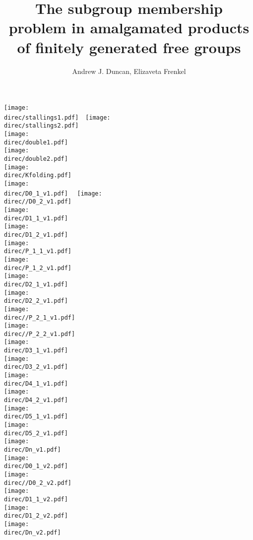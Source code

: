 \documentclass[a4paper,12pt]{article}
\title{The subgroup membership problem in amalgamated products of 
finitely generated free groups
}
\author{Andrew J. Duncan, Elizaveta Frenkel}
\newcommand{\direc}{input_K}
\numberwithin{equation}{section}
\numberwithin{figure}{section}
\begin{document}
\texttt{[image: \\direc/stallings1.pdf]}~~\texttt{[image: \\direc/stallings2.pdf]}\\
\texttt{[image: \\direc/double1.pdf]}\\
\texttt{[image: \\direc/double2.pdf]}\\
\texttt{[image: \\direc/Kfolding.pdf]}\\
\texttt{[image: \\direc/D0\_1\_v1.pdf]}~~
\texttt{[image: \\direc//D0\_2\_v1.pdf]}\\
\texttt{[image: \\direc/D1\_1\_v1.pdf]}\\
\texttt{[image: \\direc/D1\_2\_v1.pdf]}\\
\texttt{[image: \\direc/P\_1\_1\_v1.pdf]}\\
\texttt{[image: \\direc/P\_1\_2\_v1.pdf]}\\
\texttt{[image: \\direc/D2\_1\_v1.pdf]}\\
\texttt{[image: \\direc/D2\_2\_v1.pdf]}\\
\texttt{[image: \\direc//P\_2\_1\_v1.pdf]}\\
\texttt{[image: \\direc//P\_2\_2\_v1.pdf]}\\
\texttt{[image: \\direc/D3\_1\_v1.pdf]}\\
\texttt{[image: \\direc/D3\_2\_v1.pdf]}\\
\texttt{[image: \\direc/D4\_1\_v1.pdf]}\\
\texttt{[image: \\direc/D4\_2\_v1.pdf]}\\
\texttt{[image: \\direc/D5\_1\_v1.pdf]}\\
\texttt{[image: \\direc/D5\_2\_v1.pdf]}\\
\texttt{[image: \\direc/Dn\_v1.pdf]}\\
\texttt{[image: \\direc/D0\_1\_v2.pdf]}\\
\texttt{[image: \\direc//D0\_2\_v2.pdf]}\\
\texttt{[image: \\direc/D1\_1\_v2.pdf]}\\
\texttt{[image: \\direc/D1\_2\_v2.pdf]}\\
\texttt{[image: \\direc/Dn\_v2.pdf]}\\
\end{document}
